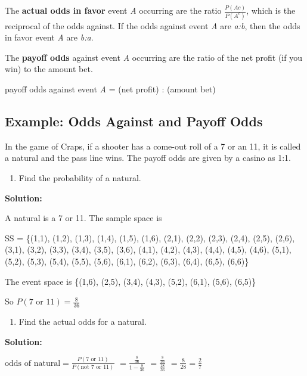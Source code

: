 \documentclass[]{book}
\providecommand{\tightlist}{%
  \setlength{\itemsep}{0pt}\setlength{\parskip}{0pt}}
\begin{document}
The \textbf{actual odds in favor} event \emph{A} occurring are the ratio \(\frac{P(Ac)}{P(A^c)}\), which is the reciprocal of the odds against. If the odds against event \emph{A} are \emph{a:b}, then the odds in favor event \emph{A} are \emph{b:a}.

The \textbf{payoff odds} against event \emph{A} occurring are the ratio of the net
profit (if you win) to the amount bet.

payoff odds against event \emph{A} = (net profit) : (amount bet)

\hypertarget{example-odds-against-and-payoff-odds}{%
\subsection{Example: Odds Against and Payoff Odds}\label{example-odds-against-and-payoff-odds}}

In the game of Craps, if a shooter has a come-out roll of a 7 or an 11, it is called a natural and the pass line wins. The payoff odds are given by a casino as 1:1.

\begin{enumerate}
\def\labelenumi{\alph{enumi}.}
\tightlist
\item
  Find the probability of a natural.
\end{enumerate}

\textbf{Solution:}

A natural is a 7 or 11. The sample space is

SS = \{(1,1), (1,2), (1,3), (1,4), (1,5), (1,6),
(2,1), (2,2), (2,3), (2,4), (2,5), (2,6),
(3,1), (3,2), (3,3), (3,4), (3,5), (3,6),
(4,1), (4,2), (4,3), (4,4), (4,5), (4,6),
(5,1), (5,2), (5,3), (5,4), (5,5), (5,6),
(6,1), (6,2), (6,3), (6,4), (6,5), (6,6)\}

The event space is \{(1,6), (2,5), (3,4), (4,3), (5,2), (6,1), (5,6),
(6,5)\}

So \(P(\text{7 or 11})=\frac{8}{36}\)

\begin{enumerate}
\def\labelenumi{\alph{enumi}.}
\setcounter{enumi}{1}
\tightlist
\item
  Find the actual odds for a natural.
\end{enumerate}

\textbf{Solution:}

\(\text{odds of natural}=\frac{P(\text{7 or 11})}{P(\text{not 7 or 11})}\)
\(=\frac{\frac{8}{36}}{1-\frac{8}{36}}\)
\(=\frac{\frac{8}{36}}{\frac{28}{36}}\)
\(=\frac{8}{28}=\frac{2}{7}\)
\end{document}
